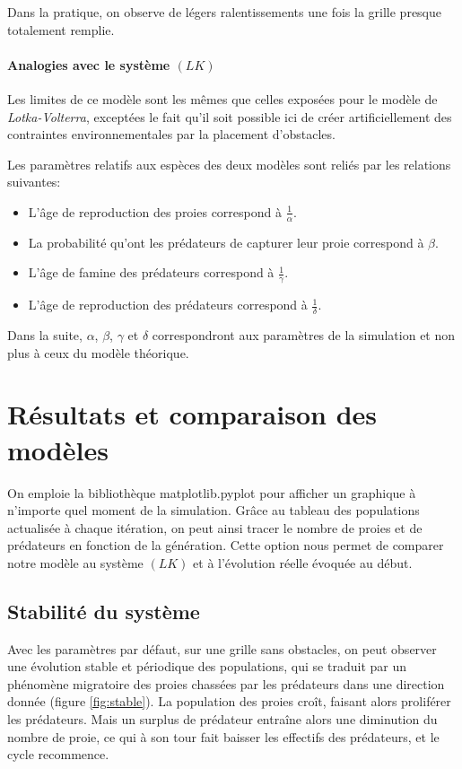 \documentclass[11pt]{article}
\begin{document}
Dans la pratique, on observe de légers ralentissements une fois la grille presque totalement remplie.

\paragraph{Analogies avec le système $(LK)$}
Les limites de ce modèle sont les mêmes que celles exposées pour le modèle de \emph{Lotka-Volterra}, exceptées le fait qu'il soit possible ici de créer artificiellement des contraintes environnementales par la placement d'obstacles.


Les paramètres relatifs aux espèces des deux modèles sont reliés par les relations suivantes:
\begin{itemize}[label=\textendash]
    \item L'âge de reproduction des proies correspond à $\frac{1}{\alpha}$.
    \item La probabilité qu'ont les prédateurs de capturer leur proie correspond à $\beta$.
    \item L'âge de famine des prédateurs correspond à $\frac{1}{\gamma}$.
    \item L'âge de reproduction des prédateurs correspond à $\frac{1}{\delta}$.
\end{itemize}
Dans la suite, $\alpha$, $\beta$, $\gamma$ et $\delta$ correspondront aux paramètres de la simulation et non plus à ceux du modèle théorique.

\section{Résultats et comparaison des modèles}

On emploie la bibliothèque \textsf{matplotlib.pyplot} pour afficher un graphique à n'importe quel moment de la simulation. Grâce au tableau des populations actualisée à chaque itération, on peut ainsi tracer le nombre de proies et de prédateurs en fonction de la génération. Cette option nous permet de comparer notre modèle au système $(LK)$ et à l'évolution réelle évoquée au début.

\subsection{Stabilité du système}
Avec les paramètres par défaut, sur une grille sans obstacles, on peut observer une évolution stable et périodique des populations, qui se traduit par un phénomène migratoire des proies chassées par les prédateurs dans une direction donnée (figure \ref{fig:stable}). La population des proies croît, faisant alors proliférer les prédateurs. Mais un surplus de prédateur entraîne alors une diminution du nombre de proie, ce qui à son tour fait baisser les effectifs des prédateurs, et le cycle recommence.
\end{document}
